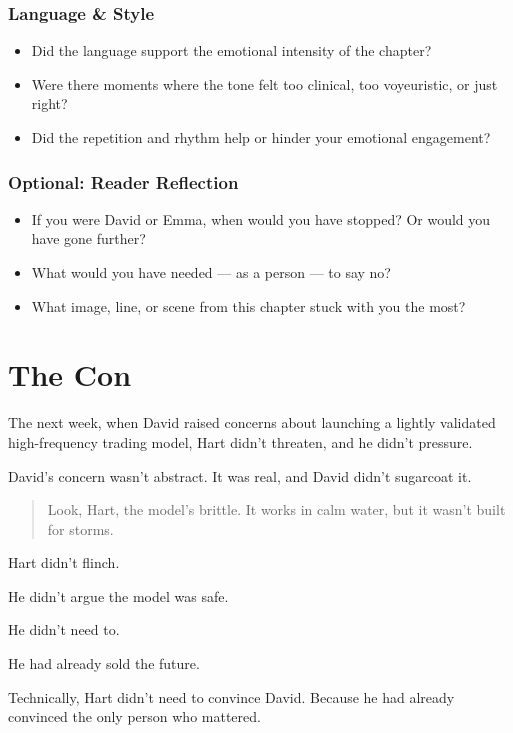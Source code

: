 \subsubsection{Language \& Style}

\begin{itemize}
  \item Did the language support the emotional intensity of the chapter?
  \item Were there moments where the tone felt too clinical, too voyeuristic, or just right?
  \item Did the repetition and rhythm help or hinder your emotional engagement?
\end{itemize}

\subsubsection{Optional: Reader Reflection}

\begin{itemize}
  \item If you were David or Emma, when would you have stopped? Or would you have gone further?
  \item What would you have needed — as a person — to say no?
  \item What image, line, or scene from this chapter stuck with you the most?
\end{itemize}




\section{The Con}

The next week, when David raised concerns about launching a lightly validated high-frequency trading model,  
Hart didn’t threaten, and he didn’t pressure.

David’s concern wasn’t abstract. It was real, and David didn’t sugarcoat it.

\begin{quote}
  Look, Hart, the model’s brittle. It works in calm water, but it wasn’t built for storms.
\end{quote}

Hart didn’t flinch.  

He didn’t argue the model was safe.  

He didn’t need to.  

He had already sold the future.

Technically, Hart didn’t need to convince David. Because he had already convinced the only person who mattered.

